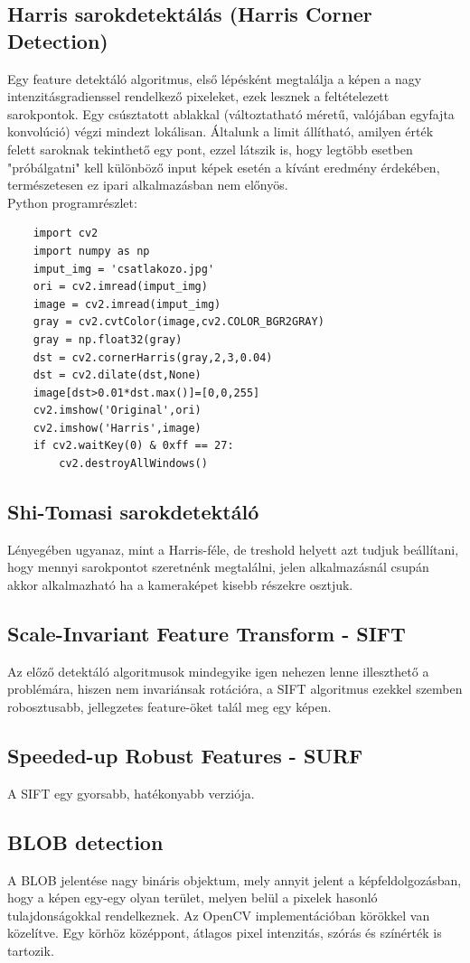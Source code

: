 \documentclass{article}
\begin{document}
 \subsection{Harris sarokdetektálás (Harris Corner Detection)}
Egy feature detektáló algoritmus, első lépésként 
megtalálja a képen a nagy intenzitásgradienssel rendelkező
pixeleket, ezek lesznek a feltételezett sarokpontok.
Egy csúsztatott ablakkal (változtatható méretű, valójában egyfajta konvolúció)
végzi mindezt lokálisan. Általunk a limit állítható, 
amilyen érték felett saroknak tekinthető egy pont, 
ezzel látszik is, hogy legtöbb esetben "próbálgatni" kell 
különböző input képek esetén a kívánt eredmény érdekében, természetesen 
ez ipari alkalmazásban nem előnyös.\\[5pt]
Python programrészlet:\\
\begin{lstlisting}
    import cv2
    import numpy as np 
    imput_img = 'csatlakozo.jpg'
    ori = cv2.imread(imput_img)
    image = cv2.imread(imput_img)
    gray = cv2.cvtColor(image,cv2.COLOR_BGR2GRAY)
    gray = np.float32(gray)
    dst = cv2.cornerHarris(gray,2,3,0.04)
    dst = cv2.dilate(dst,None)
    image[dst>0.01*dst.max()]=[0,0,255]
    cv2.imshow('Original',ori) 
    cv2.imshow('Harris',image)
    if cv2.waitKey(0) & 0xff == 27:
        cv2.destroyAllWindows()
\end{lstlisting}
\subsection{Shi-Tomasi sarokdetektáló}
Lényegében ugyanaz, mint a Harris-féle, de treshold helyett
azt tudjuk beállítani, hogy mennyi sarokpontot szeretnénk megtalálni,
jelen alkalmazásnál csupán akkor alkalmazható ha a 
kameraképet kisebb részekre osztjuk.
 \subsection{Scale-Invariant Feature Transform - SIFT}
Az előző detektáló algoritmusok mindegyike igen 
nehezen lenne illeszthető a problémára, hiszen
nem invariánsak rotációra, a SIFT algoritmus ezekkel 
szemben robosztusabb, jellegzetes feature-öket talál 
meg egy képen.
 \subsection{Speeded-up Robust Features - SURF}
A SIFT egy gyorsabb, hatékonyabb verziója.
 \subsection{BLOB detection}
A BLOB jelentése nagy bináris objektum, mely annyit jelent a képfeldolgozásban, hogy
a képen egy-egy olyan terület, melyen belül a pixelek hasonló tulajdonságokkal
rendelkeznek. Az OpenCV implementációban körökkel van közelítve.
Egy körhöz középpont, átlagos pixel intenzitás, szórás és színérték is tartozik.
\end{document}
